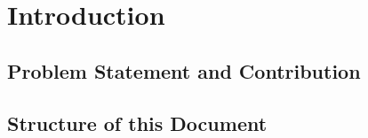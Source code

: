 \section{Introduction}

\subsection{Problem Statement and Contribution}

\subsection{Structure of this Document}

